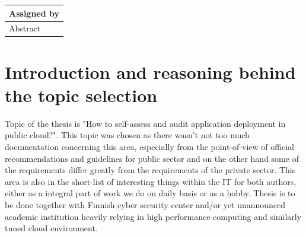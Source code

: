 \documentclass{article}
\begin{document}
\begin{table}[]
\begin{tabular}{|l|l|l|}
\multicolumn{3}{|l|}{Assigned by}                                                                                                                                                                                                                                    \\ \hline
\multicolumn{3}{|l|}{\multirow{5}{*}{Abstract}}                                                                                                                                                                                                                      \\
\multicolumn{3}{|l|}{}                                                                                                                                                                                                                                               \\
\multicolumn{3}{|l|}{}                                                                                                                                                                                                                                               \\
\multicolumn{3}{|l|}{}                                                                                                                                                                                                                                               \\
\multicolumn{3}{|l|}{}                                                                                                                                                                                                                                               \\ \hline
\end{tabular}
\end{table}
\clearpage

\doublespacing
\tableofcontents
\pagebreak 
\setcounter{page}{1}
\rhead{\thepage}
\section{Introduction and reasoning behind the topic selection}
Topic of the thesis is "How to self-assess and audit application deployment in public cloud?". This topic was chosen as there wasn't not too much documentation concerning this area, especially from the point-of-view of official recommendations and guidelines for public sector and on the other hand some of the requirements differ greatly from the requirements of the private sector. This area is also in the short-list of interesting things within the IT for both authors, either as a integral part of work we do on daily basis or as a hobby.
Thesis is to be done together with Finnish cyber security center and/or yet unannounced academic institution heavily relying in high performance computing and similarly tuned cloud environment. 
\end{document}
